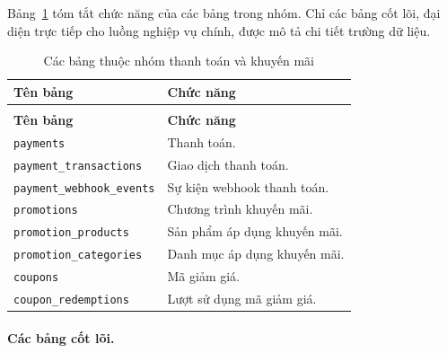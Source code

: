 Bảng~\ref{tab:data-summary-payment-promotion} tóm tắt chức năng của các bảng trong nhóm. Chỉ các bảng cốt lõi, đại diện trực tiếp cho luồng nghiệp vụ chính, được mô tả chi tiết trường dữ liệu.

\begin{longtable}{|>{\RaggedRight\arraybackslash}p{}|>{\RaggedRight\arraybackslash}p{}|}
    \caption{Các bảng thuộc nhóm thanh toán và khuyến mãi}
    \label{tab:data-summary-payment-promotion} \\
    \hline
    \textbf{Tên bảng} & \textbf{Chức năng} \\
    \hline
    \endfirsthead
    \multicolumn{2}{c}{\tablename\ \thetable\ (tiếp theo)} \\
    \hline
    \textbf{Tên bảng} & \textbf{Chức năng} \\
    \hline
    \endhead
    \texttt{payments} & Thanh toán. \\
    \hline
    \texttt{payment\_transactions} & Giao dịch thanh toán. \\
    \hline
    \texttt{payment\_webhook\_events} & Sự kiện webhook thanh toán. \\
    \hline
    \texttt{promotions} & Chương trình khuyến mãi. \\
    \hline
    \texttt{promotion\_products} & Sản phẩm áp dụng khuyến mãi. \\
    \hline
    \texttt{promotion\_categories} & Danh mục áp dụng khuyến mãi. \\
    \hline
    \texttt{coupons} & Mã giảm giá. \\
    \hline
    \texttt{coupon\_redemptions} & Lượt sử dụng mã giảm giá. \\
    \hline
\end{longtable}

\paragraph{Các bảng cốt lõi.}

